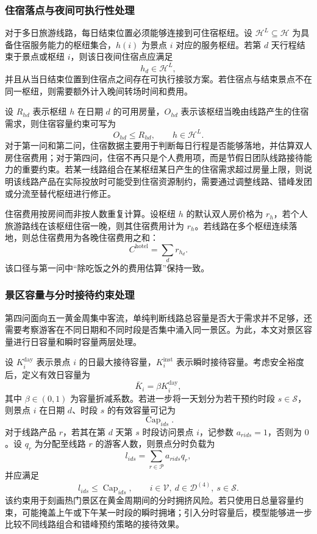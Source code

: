 \documentclass[UTF8,zihao=-4,a4paper]{ctexart}
\begin{document}
\subsubsection{住宿落点与夜间可执行性处理}

对于多日旅游线路，每日结束位置必须能够连接到可住宿枢纽。设 $\mathcal{H}^{L}\subseteq \mathcal{H}$ 为具备住宿服务能力的枢纽集合，$h(i)$ 为景点 $i$ 对应的服务枢纽。若第 $d$ 天行程结束于景点或枢纽 $i$，则该日夜间住宿点应满足
\[
h_d \in \mathcal{H}^{L},
\]
并且从当日结束位置到住宿点之间存在可执行接驳方案。若住宿点与结束景点不在同一枢纽，则需要额外计入晚间转场时间和费用。

设 $R_{hd}$ 表示枢纽 $h$ 在日期 $d$ 的可用房量，$O_{hd}$ 表示该枢纽当晚由线路产生的住宿需求，则住宿容量约束可写为
\[
O_{hd}\leq R_{hd}, \qquad h\in\mathcal{H}^{L}.
\]
对于第一问和第二问，住宿数据主要用于判断每日行程是否能够落地，并估算双人房住宿费用；对于第四问，住宿不再只是个人费用项，而是节假日团队线路接待能力的重要约束。若某一线路组合在某枢纽某日产生的住宿需求超过房量上限，则说明该线路产品在实际投放时可能受到住宿资源制约，需要通过调整线路、错峰发团或分流至替代枢纽进行修正。

住宿费用按房间而非按人数重复计算。设枢纽 $h$ 的默认双人房价格为 $r_h$，若个人旅游路线在该枢纽住宿一晚，则其住宿费用计为 $r_h$。若线路在多个枢纽连续落地，则总住宿费用为各晚住宿费用之和：
\[
C^{\mathrm{hotel}}
=
\sum_{d} r_{h_d}.
\]
该口径与第一问中“除吃饭之外的费用估算”保持一致。

\subsubsection{景区容量与分时接待约束处理}

第四问面向五一黄金周集中客流，单纯判断线路总容量是否大于需求并不足够，还需要考察游客在不同日期和不同时段是否集中涌入同一景区。为此，本文对景区容量进行日容量和瞬时容量两层处理。

设 $K_i^{\mathrm{day}}$ 表示景点 $i$ 的日最大接待容量，$K_i^{\mathrm{inst}}$ 表示瞬时接待容量。考虑安全裕度后，定义有效日容量为
\[
\bar{K}_i = \beta K_i^{\mathrm{day}},
\]
其中 $\beta\in(0,1)$ 为容量折减系数。若进一步将一天划分为若干预约时段 $s\in\mathcal{S}$，则景点 $i$ 在日期 $d$、时段 $s$ 的有效容量可记为
\[
\operatorname{Cap}_{ids}.
\]
对于线路产品 $r$，若其在第 $d$ 天第 $s$ 时段访问景点 $i$，记参数 $a_{rids}=1$，否则为 $0$。设 $q_r$ 为分配至线路 $r$ 的游客人数，则景点分时负载为
\[
l_{ids}
=
\sum_{r\in\mathcal{P}} a_{rids}q_r,
\]
并应满足
\[
l_{ids}\leq \operatorname{Cap}_{ids},
\qquad
i\in\mathcal{V},\ d\in\mathcal{D}^{(4)},\ s\in\mathcal{S}.
\]
该约束用于刻画热门景区在黄金周期间的分时拥挤风险。若只使用日总量容量约束，可能掩盖上午或下午某一时段的瞬时拥堵；引入分时容量后，模型能够进一步比较不同线路组合和错峰预约策略的接待效果。
\end{document}
